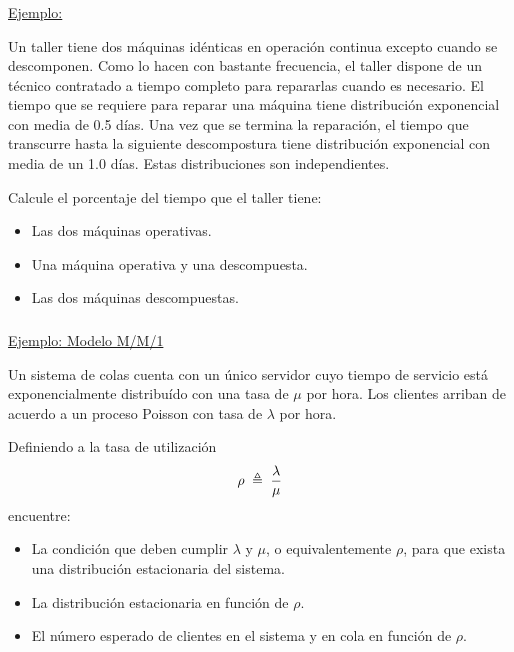 \documentclass[ 10pt, xcolor = dvipsnames]{beamer}
\begin{document}
\begin{frame}[allowframebreaks]
\frametitle{\insertsubsection}

\underline{Ejemplo:}

Un taller tiene dos m\'aquinas id\'enticas en operaci\'on continua excepto cuando se descomponen. Como lo hacen con bastante frecuencia, el taller dispone de un t\'ecnico contratado a tiempo completo para repararlas cuando es necesario. \linebreak El tiempo que se requiere para reparar una m\'aquina tiene distribuci\'on exponencial con media de 0.5 d\'ias. Una vez que se termina la reparaci\'on, el tiempo que transcurre hasta la siguiente descompostura tiene distribuci\'on exponencial con media de un 1.0 d\'ias. Estas distribuciones son independientes. 

Calcule el porcentaje del tiempo que el taller tiene:
\begin{itemize}
\item Las dos m\'aquinas operativas. 
\item Una m\'aquina operativa y una descompuesta. 
\item Las dos m\'aquinas descompuestas. 
\end{itemize}

\end{frame}

\begin{frame}[allowframebreaks]
\frametitle{\insertsubsection}

\underline{Ejemplo: Modelo M/M/1}

Un sistema de colas cuenta con un \'unico servidor cuyo tiempo de servicio est\'a exponencialmente distribu\'ido con una tasa de $\mu$ por hora. Los clientes arriban de acuerdo a un proceso Poisson con tasa de $\lambda$ por hora. 

Definiendo a la tasa de utilizaci\'on 
\[
\rho \; \triangleq \; \frac{\lambda}{\mu}
\]
encuentre: 

\begin{itemize}
\item La condici\'on que deben cumplir $\lambda$ y $\mu$, o equivalentemente $\rho$, para que \linebreak exista una distribuci\'on estacionaria del sistema. 
\item La distribuci\'on estacionaria en funci\'on de $\rho$. 
\item El n\'umero esperado de clientes en el sistema y en cola en funci\'on de $\rho$. 
\end{itemize}

\end{frame}
\end{document}
